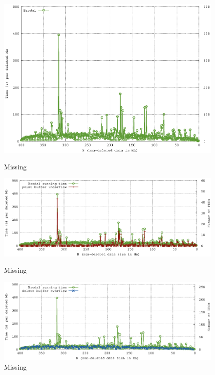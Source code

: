 \documentclass[twoside,11pt,openright]{report}
\begin{document}
\begin{figure}[h]
\centering

\includegraphics[width=\textwidth]{../src/experiments/delete_experiment_results/2016-05-31.08_55_51/time3}
\caption{Missing}
\label{fig:delete_complexity_result}

\includegraphics[width=\linewidth]{../src/experiments/delete_experiment_results/2016-05-31.08_55_51/pbu_time}
\caption{Missing}
\label{fig:missing}

\includegraphics[width=\linewidth]{../src/experiments/delete_experiment_results/2016-05-31.08_55_51/dbo_time}
\caption{Missing}
\label{fig:missing}

\end{figure}
\end{document}
